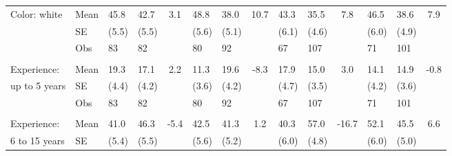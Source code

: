 \documentclass[
	article,			%
	12pt,				%
	oneside,			%
	a4paper,			%
	]{article}
\begin{document}
\begin{table}[h!]
\begin{tabular}{lp{2.335em}p{1.915em}p{2.085em}cp{1.915em}p{1.915em}cp{1.915em}p{1.915em}cp{1.915em}p{1.915em}c}
Color: white &       Mean &       45.8 &       42.7 &        3.1 &       48.8 &       38.0 &      10.7 &       43.3 &       35.5 &       7.8 &       46.5 &       38.6 &        7.9 \\

           &         SE &      (5.5) &      (5.5) &            &      (5.6) &      (5.1) &            &      (6.1) &      (4.6) &            &      (6.0) &      (4.9) &            \\

           &        Obs &         83 &         82 &            &         80 &         92 &            &         67 &        107 &            &         71 &        101 &            \\

           &            &            &            &            &            &            &            &            &            &            &            &            &            \\

Experience:  &       Mean &       19.3 &       17.1 &        2.2 &       11.3 &       19.6 &       -8.3 &       17.9 &       15.0 &        3.0 &       14.1 &       14.9 &       -0.8 \\

up to 5 years &         SE &      (4.4) &      (4.2) &            &      (3.6) &      (4.2) &            &      (4.7) &      (3.5) &            &      (4.2) &      (3.6) &            \\

           &        Obs &         83 &         82 &            &         80 &         92 &            &         67 &        107 &            &         71 &        101 &            \\

           &            &            &            &            &            &            &            &            &            &            &            &            &            \\

Experience:  &       Mean &       41.0 &       46.3 &       -5.4 &       42.5 &       41.3 &        1.2 &       40.3 &       57.0 &    -16.7 &       52.1 &       45.5 &        6.6 \\

6 to 15 years &         SE &      (5.4) &      (5.5) &            &      (5.6) &      (5.2) &            &      (6.0) &      (4.8) &            &      (6.0) &      (5.0) &            \\


\end{tabular}
\end{table}
\end{document}
